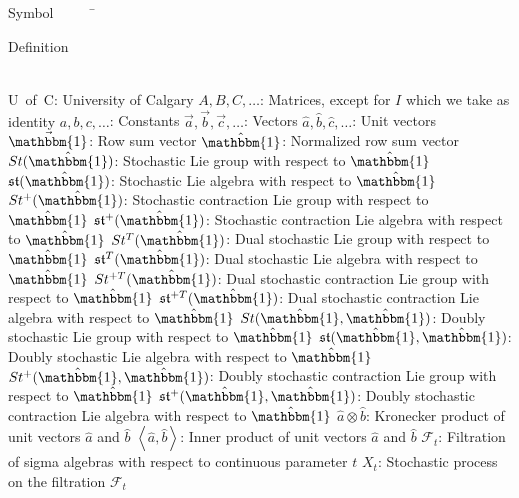 \begin{tabbing}
	Symbol~~~~~\= \ \ \ \ \ \ \ \ \ \ \ \ \ \ \ \ \ \ \ \ \ \ \ \ \ \ \ \ \ \ \ \ \ \ \ \  \parbox{5in}{Definition}\\
	\addsymbol \mbox{U of C}: {University of Calgary}
	\addsymbol \mbox{$A,B,C,\dots$}: {Matrices, except for $I$ which we take as identity}
	\addsymbol \mbox{$a,b,c,\dots$}: {Constants}
	\addsymbol \mbox{$\vec{a},\vec{b},\vec{c},\dots$}: {Vectors}
	\addsymbol \mbox{$\hat{a},\hat{b},\hat{c},\dots$}: {Unit vectors}
	\addsymbol \mbox{$\vec{\mathbbm{1}}$}: {Row sum vector}
	\addsymbol \mbox{$\hat{\mathbbm{1}}$}: {Normalized row sum vector}
	\addsymbol \mbox{$St(\hat{\mathbbm{1}})$}: {Stochastic Lie group with respect to $\hat{\mathbbm{1}}$}
	\addsymbol \mbox{$\mathfrak{st}(\hat{\mathbbm{1}})$}: {Stochastic Lie algebra with respect to $\hat{\mathbbm{1}}$}
	\addsymbol \mbox{$St^{+}(\hat{\mathbbm{1}})$}: {Stochastic contraction Lie group with respect to $\hat{\mathbbm{1}}$}
	\addsymbol \mbox{$\mathfrak{st}^{+}(\hat{\mathbbm{1}})$}: {Stochastic contraction Lie algebra with respect to $\hat{\mathbbm{1}}$}
	\addsymbol \mbox{$St^T(\hat{\mathbbm{1}})$}: {Dual stochastic Lie group with respect to $\hat{\mathbbm{1}}$}
	\addsymbol \mbox{$\mathfrak{st}^T(\hat{\mathbbm{1}})$}: {Dual stochastic Lie algebra with respect to $\hat{\mathbbm{1}}$}
	\addsymbol \mbox{$St^{+T}(\hat{\mathbbm{1}})$}: {Dual stochastic contraction Lie group with respect to $\hat{\mathbbm{1}}$}
	\addsymbol \mbox{$\mathfrak{st}^{+T}(\hat{\mathbbm{1}})$}: {Dual stochastic contraction Lie algebra with respect to $\hat{\mathbbm{1}}$}
	\addsymbol \mbox{$St(\hat{\mathbbm{1}}, \hat{\mathbbm{1}})$}: {Doubly stochastic Lie group with respect to $\hat{\mathbbm{1}}$}
	\addsymbol \mbox{$\mathfrak{st}(\hat{\mathbbm{1}}, \hat{\mathbbm{1}})$}: {Doubly stochastic Lie algebra with respect to $\hat{\mathbbm{1}}$}
	\addsymbol \mbox{$St^{+}(\hat{\mathbbm{1}}, \hat{\mathbbm{1}})$}: {Doubly stochastic contraction Lie group with respect to $\hat{\mathbbm{1}}$}
	\addsymbol \mbox{$\mathfrak{st}^{+}(\hat{\mathbbm{1}}, \hat{\mathbbm{1}})$}: {Doubly stochastic contraction Lie algebra with respect to $\hat{\mathbbm{1}}$}
	\addsymbol \mbox{$\hat{a} \otimes \hat{b}$}: {Kronecker product of unit vectors $\hat{a}$ and $\hat{b}$}
	\addsymbol \mbox{$\left\langle \hat{a},\hat{b} \right\rangle$}: {Inner product of unit vectors $\hat{a}$ and $\hat{b}$}
	\addsymbol \mbox{$\mathscr{F}_t$}: {Filtration of sigma algebras with respect to continuous parameter $t$}
	\addsymbol \mbox{$X_t$}: {Stochastic process on the filtration $\mathscr{F}_t$}

\end{tabbing}
